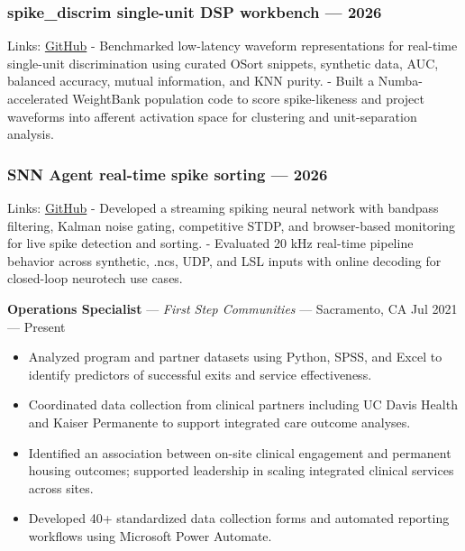 \documentclass[11pt]{article}
\providecommand{\tightlist}{\setlength{\itemsep}{0pt}\setlength{\parskip}{0pt}}
\renewcommand{\subsection}[1]{\par\medskip\noindent{\sffamily\bfseries\fontsize{11pt}{0}\selectfont #1}\par\smallskip}
\begin{document}
\subsubsection{spike\_discrim single-unit DSP workbench ---
2026}\label{spike_discrim-single-unit-dsp-workbench-2026}

Links:
\href{https://github.com/BarkBarkBarkBarkBarkBarkBark/spike_discrim}{GitHub}
- Benchmarked low-latency waveform representations for real-time
single-unit discrimination using curated OSort snippets, synthetic data,
AUC, balanced accuracy, mutual information, and KNN purity. - Built a
Numba-accelerated WeightBank population code to score spike-likeness and
project waveforms into afferent activation space for clustering and
unit-separation analysis.

\subsubsection{SNN Agent real-time spike sorting ---
2026}\label{snn-agent-real-time-spike-sorting-2026}

Links:
\href{https://github.com/BarkBarkBarkBarkBarkBarkBark/SNNeuro}{GitHub} -
Developed a streaming spiking neural network with bandpass filtering,
Kalman noise gating, competitive STDP, and browser-based monitoring for
live spike detection and sorting. - Evaluated 20 kHz real-time pipeline
behavior across synthetic, .ncs, UDP, and LSL inputs with online
decoding for closed-loop neurotech use cases.

\subsection{Experience}\label{experience}

\textbf{Operations Specialist} --- \emph{First Step Communities} ---
Sacramento, CA Jul 2021 --- Present

\begin{itemize}
\tightlist
\item
  Analyzed program and partner datasets using Python, SPSS, and Excel to
  identify predictors of successful exits and service effectiveness.
\item
  Coordinated data collection from clinical partners including UC Davis
  Health and Kaiser Permanente to support integrated care outcome
  analyses.
\item
  Identified an association between on-site clinical engagement and
  permanent housing outcomes; supported leadership in scaling integrated
  clinical services across sites.
\item
  Developed 40+ standardized data collection forms and automated
  reporting workflows using Microsoft Power Automate.
\end{itemize}
\end{document}
